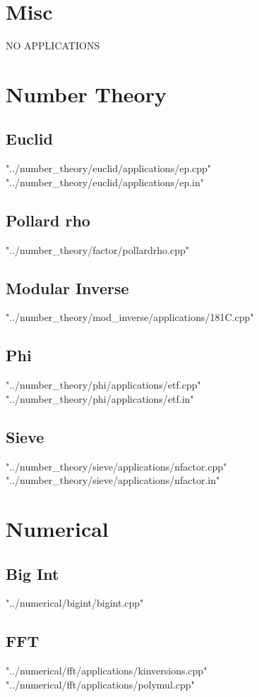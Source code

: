 \documentclass [12pt,onecolumn,oneside]{article}
\begin{document}
\section{Misc}
NO APPLICATIONS
\newpage

\section{Number Theory}
\subsection{ Euclid}
 {"../number_theory/euclid/applications/ep.cpp"}
 {"../number_theory/euclid/applications/ep.in"}
\subsection{ Pollard rho}
 {"../number_theory/factor/pollardrho.cpp"}
\subsection{ Modular Inverse}
 {"../number_theory/mod_inverse/applications/181C.cpp"}
\subsection{ Phi}
 {"../number_theory/phi/applications/etf.cpp"}
 {"../number_theory/phi/applications/etf.in"}
\subsection{ Sieve}
 {"../number_theory/sieve/applications/nfactor.cpp"}
 {"../number_theory/sieve/applications/nfactor.in"}
\newpage

\section{Numerical}
\subsection{ Big Int}
 {"../numerical/bigint/bigint.cpp"}
\subsection{ FFT}
 {"../numerical/fft/applications/kinversions.cpp"}
 {"../numerical/fft/applications/polymul.cpp"}
\end{document}
